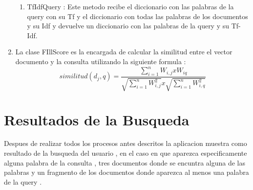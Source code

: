 \documentclass[12 pts,spanish]{article}
\begin{document}
\begin{enumerate}
\begin{enumerate}
        \item TfIdfQuery : Este metodo recibe el diccionario con las palabras de la query con su Tf y el diccionario con todas las palabras de los documentos y su Idf y devuelve un diccionario con las palabras de la query y su Tf-Idf.
        
    \end{enumerate}
    \item La clase FIllScore es la encargada de calcular la similitud entre el vector documento y la consulta utilizando la siguiente formula :
    \begin{equation}
     similitud(d_{j},q) = \frac{\sum_{i=1}^{n} W_{i,j} x  W_{iq}}{\sqrt{\sum_{i=1}^{n} W_{i,j}^2}  x  \sqrt{\sum_{i=1}^{n} W_{i,q}^2}}
    \end{equation} 
    
\end {enumerate}

\section{Resultados de la Busqueda}
Despues de realizar todos los procesos antes descritos la aplicacion muestra como resultado de la busqueda del usuario , en el caso en que aparezca especificamente alguna palabra de la consulta , tres documentos donde se encuntra alguna de las palabras y un fragmento de los documentos donde aparezca al menos una palabra de la query .
\end{document}
